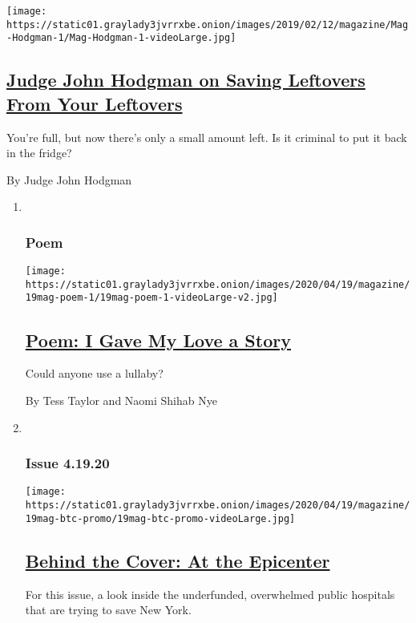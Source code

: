 \begin{enumerate}
  \texttt{[image: https://static01.graylady3jvrrxbe.onion/images/2019/02/12/magazine/Mag-Hodgman-1/Mag-Hodgman-1-videoLarge.jpg]}

  \hypertarget{judge-john-hodgman-on-saving-leftovers-from-your-leftovers}{%
  \subsection{\texorpdfstring{\href{/2020/04/16/magazine/judge-john-hodgman-on-saving-leftovers-from-your-leftovers.html}{Judge
  John Hodgman on Saving Leftovers From Your
  Leftovers}}{Judge John Hodgman on Saving Leftovers From Your Leftovers}}\label{judge-john-hodgman-on-saving-leftovers-from-your-leftovers}}

  You're full, but now there's only a small amount left. Is it criminal
  to put it back in the fridge?

  By Judge John Hodgman
\end{enumerate}

\begin{enumerate}
\def\labelenumi{\arabic{enumi}.}
\item ~
  \hypertarget{poem}{%
  \subsubsection{Poem}\label{poem}}

  \texttt{[image: https://static01.graylady3jvrrxbe.onion/images/2020/04/19/magazine/19mag-poem-1/19mag-poem-1-videoLarge-v2.jpg]}

  \hypertarget{poem-i-gave-my-love-a-story}{%
  \subsection{\texorpdfstring{\href{/2020/04/16/magazine/poem-i-gave-my-love-a-story.html}{Poem:
  I Gave My Love a
  Story}}{Poem: I Gave My Love a Story}}\label{poem-i-gave-my-love-a-story}}

  Could anyone use a lullaby?

  By Tess Taylor and Naomi Shihab Nye
\item ~
  \hypertarget{issue-41920}{%
  \subsubsection{Issue 4.19.20}\label{issue-41920}}

  \texttt{[image: https://static01.graylady3jvrrxbe.onion/images/2020/04/19/magazine/19mag-btc-promo/19mag-btc-promo-videoLarge.jpg]}

  \hypertarget{behind-the-cover-at-the-epicenter}{%
  \subsection{\texorpdfstring{\href{/2020/04/16/magazine/behind-the-cover-at-the-epicenter.html}{Behind
  the Cover: At the
  Epicenter}}{Behind the Cover: At the Epicenter}}\label{behind-the-cover-at-the-epicenter}}

  For this issue, a look inside the underfunded, overwhelmed public
  hospitals that are trying to save New York.
\end{enumerate}


